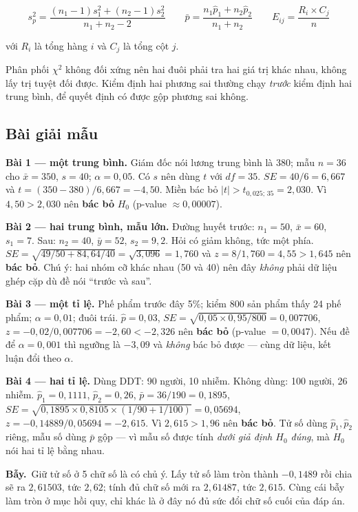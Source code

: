 \documentclass[11pt]{article}
\newcommand{\bay}{\textbf{Bẫy.}\ }
\begin{document}
\[
s_p^2 = \frac{(n_1-1)s_1^2+(n_2-1)s_2^2}{n_1+n_2-2}
\qquad
\bar p = \frac{n_1\hat p_1+n_2\hat p_2}{n_1+n_2}
\qquad
E_{ij} = \frac{R_i \times C_j}{n}
\]

với $R_i$ là tổng hàng $i$ và $C_j$ là tổng cột $j$.

Phân phối $\chi^2$ không đối xứng nên hai đuôi phải tra hai giá trị khác nhau,
không lấy trị tuyệt đối được. Kiểm định hai phương sai thường chạy \emph{trước}
kiểm định hai trung bình, để quyết định có được gộp phương sai không.

\subsection*{Bài giải mẫu}

\textbf{Bài 1 --- một trung bình.} Giám đốc nói lương trung bình là 380; mẫu
$n=36$ cho $\bar x = 350$, $s=40$; $\alpha = 0{,}05$.
Có $s$ nên dùng $t$ với $df=35$. $SE = 40/6 = 6{,}667$ và
$t = (350-380)/6{,}667 = -4{,}50$. Miền bác bỏ $|t| > t_{0{,}025;\,35} = 2{,}030$.
Vì $4{,}50 > 2{,}030$ nên \textbf{bác bỏ} $H_0$ (p-value $\approx 0{,}00007$).

\textbf{Bài 2 --- hai trung bình, mẫu lớn.} Đường huyết trước:
$n_1=50$, $\bar x = 60$, $s_1=7$. Sau: $n_2=40$, $\bar y = 52$, $s_2=9{,}2$. Hỏi
có giảm không, tức một phía.
$SE = \sqrt{49/50 + 84{,}64/40} = \sqrt{3{,}096} = 1{,}760$ và
$z = 8/1{,}760 = 4{,}55 > 1{,}645$ nên \textbf{bác bỏ}. Chú ý: hai nhóm cỡ khác
nhau (50 và 40) nên đây \emph{không} phải dữ liệu ghép cặp dù đề nói ``trước và sau''.

\textbf{Bài 3 --- một tỉ lệ.} Phế phẩm trước đây 5\%; kiểm 800 sản phẩm thấy 24
phế phẩm; $\alpha=0{,}01$; đuôi trái.
$\hat p = 0{,}03$, $SE = \sqrt{0{,}05 \times 0{,}95/800} = 0{,}007706$,
$z = -0{,}02/0{,}007706 = -2{,}60 < -2{,}326$ nên \textbf{bác bỏ}
(p-value $=0{,}0047$). Nếu đề để $\alpha = 0{,}001$ thì ngưỡng là $-3{,}09$ và
\emph{không} bác bỏ được --- cùng dữ liệu, kết luận đổi theo $\alpha$.

\textbf{Bài 4 --- hai tỉ lệ.} Dùng DDT: 90 người, 10 nhiễm. Không dùng: 100 người,
26 nhiễm.
$\hat p_1 = 0{,}1111$, $\hat p_2 = 0{,}26$, $\bar p = 36/190 = 0{,}1895$,
$SE = \sqrt{0{,}1895 \times 0{,}8105 \times (1/90+1/100)} = 0{,}05694$,
$z = -0{,}14889/0{,}05694 = -2{,}615$. Vì $2{,}615 > 1{,}96$ nên \textbf{bác bỏ}.
Tử số dùng $\hat p_1, \hat p_2$ riêng, mẫu số dùng $\bar p$ gộp --- vì mẫu số
được tính \emph{dưới giả định $H_0$ đúng}, mà $H_0$ nói hai tỉ lệ bằng nhau.

\bay Giữ tử số ở 5 chữ số là có chủ ý. Lấy tử số làm tròn thành $-0{,}1489$ rồi
chia sẽ ra $2{,}61503$, tức $2{,}62$; tính đủ chữ số mới ra $2{,}61487$, tức
$2{,}615$. Cùng cái bẫy làm tròn ở mục hồi quy, chỉ khác là ở đây nó đủ sức đổi
chữ số cuối của đáp án.
\end{document}
